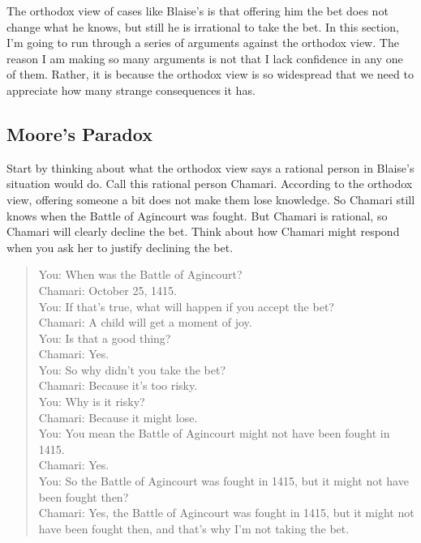 \documentclass[
  11pt,
]{book}
\begin{document}
The orthodox view of cases like Blaise's is that offering him the bet does not change what he knows, but still he is irrational to take the bet. In this section, I'm going to run through a series of arguments against the orthodox view. The reason I am making so many arguments is not that I lack confidence in any one of them. Rather, it is because the orthodox view is so widespread that we need to appreciate how many strange consequences it has.

\hypertarget{orthodoxmoore}{%
\subsection{Moore's Paradox}\label{orthodoxmoore}}

Start by thinking about what the orthodox view says a rational person in Blaise's situation would do. Call this rational person Chamari. According to the orthodox view, offering someone a bit does not make them lose knowledge. So Chamari still knows when the Battle of Agincourt was fought. But Chamari is rational, so Chamari will clearly decline the bet. Think about how Chamari might respond when you ask her to justify declining the bet.

\begin{quote}
You: When was the Battle of Agincourt?\\
Chamari: October 25, 1415.\\
You: If that's true, what will happen if you accept the bet?\\
Chamari: A child will get a moment of joy.\\
You: Is that a good thing?\\
Chamari: Yes.\\
You: So why didn't you take the bet?\\
Chamari: Because it's too risky.\\
You: Why is it risky?\\
Chamari: Because it might lose.\\
You: You mean the Battle of Agincourt might not have been fought in 1415.\\
Chamari: Yes.\\
You: So the Battle of Agincourt was fought in 1415, but it might not have been fought then?\\
Chamari: Yes, the Battle of Agincourt was fought in 1415, but it might not have been fought then, and that's why I'm not taking the bet.
\end{quote}
\end{document}
